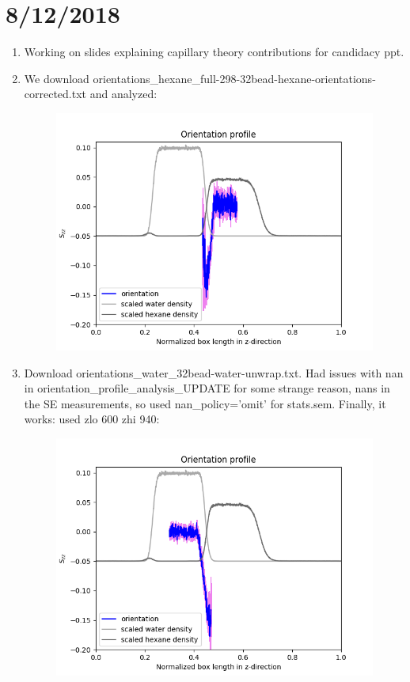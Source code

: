 \documentclass[12pt,reqno]{amsart}
\numberwithin{equation}{section}
\begin{document}
\section{8/12/2018}
\begin{enumerate}
\item Working on slides explaining capillary theory contributions for candidacy ppt.  
\item We download orientations\_hexane\_full-298-32bead-hexane-orientations-corrected.txt and analyzed:
\begin{figure}[H]
\centering
\includegraphics[scale=0.7]{full-298-32bead-orientations-hexane-corrected}
\end{figure}
\item Download orientations\_water\_32bead-water-unwrap.txt.  Had issues with nan in orientation\_profile\_analysis\_UPDATE for some strange reason, nans in the SE measurements, so used nan\_policy='omit' for stats.sem.  Finally, it works: used zlo 600 zhi 940:
\begin{figure}[H]
\centering
\includegraphics[scale=0.7]{full-298-32bead-orientations-water-corrected}
\end{figure}
\end{enumerate}
\end{document}
